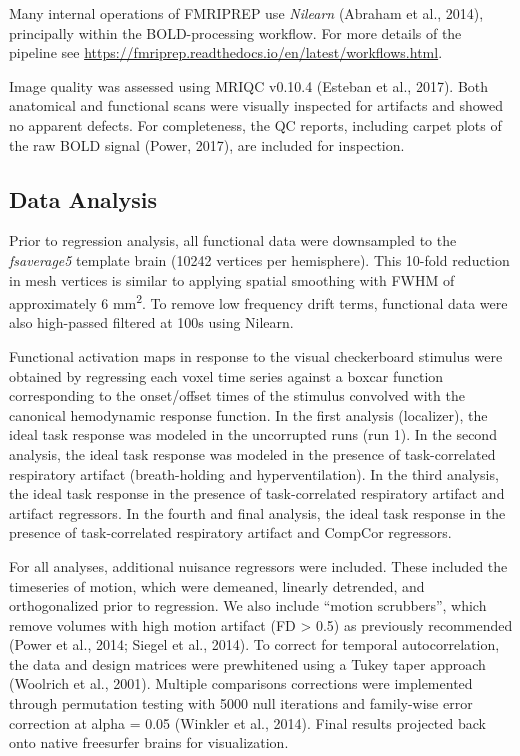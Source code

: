 \documentclass[9pt]{NEU502b-fmri}
\begin{document}
Many internal operations of FMRIPREP use \textit{Nilearn} (Abraham et al., 2014), principally within the BOLD-processing workflow. For more details of the pipeline see \href{https://fmriprep.readthedocs.io/en/latest/workflows.html}{https://fmriprep.readthedocs.io/en/latest/workflows.html}.

Image quality was assessed using MRIQC v0.10.4 (Esteban et al., 2017). Both anatomical and functional scans were visually inspected for artifacts and showed no apparent defects. For completeness, the QC reports, including carpet plots of the raw BOLD signal (Power, 2017), are included for inspection.

\subsection{Data Analysis}
Prior to regression analysis, all functional data were downsampled to the \textit{fsaverage5} template brain (10242 vertices per hemisphere). This 10-fold reduction in mesh vertices is similar to applying spatial smoothing with FWHM of approximately 6 mm\textsuperscript{2}. To remove  low frequency drift terms, functional data were also high-passed filtered at 100s using Nilearn.

Functional activation maps in response to the visual checkerboard stimulus were obtained by regressing each voxel time series against a boxcar function corresponding to the onset/offset times of the stimulus convolved with the canonical hemodynamic response function. In the first analysis (localizer), the ideal task response was modeled in the uncorrupted runs (run 1). In the second analysis, the ideal task response was modeled in the presence of task-correlated respiratory artifact (breath-holding and hyperventilation). In the third analysis,  the ideal task response in the presence of task-correlated respiratory artifact and artifact regressors. In the fourth and final analysis, the ideal task response in the presence of task-correlated respiratory artifact and CompCor regressors.

For all analyses, additional nuisance regressors were included. These included the timeseries of motion, which were demeaned, linearly detrended, and orthogonalized prior to regression. We also include “motion scrubbers”, which remove volumes with high motion artifact (FD > 0.5) as previously recommended (Power et al., 2014; Siegel et al., 2014). To correct for temporal autocorrelation, the data and design matrices were prewhitened using a Tukey taper approach (Woolrich et al., 2001). Multiple comparisons corrections were implemented through permutation testing with 5000 null iterations and family-wise error correction at alpha = 0.05 (Winkler et al., 2014). Final results projected back onto native freesurfer brains for visualization. 

\nocite{*} %

\end{document}
